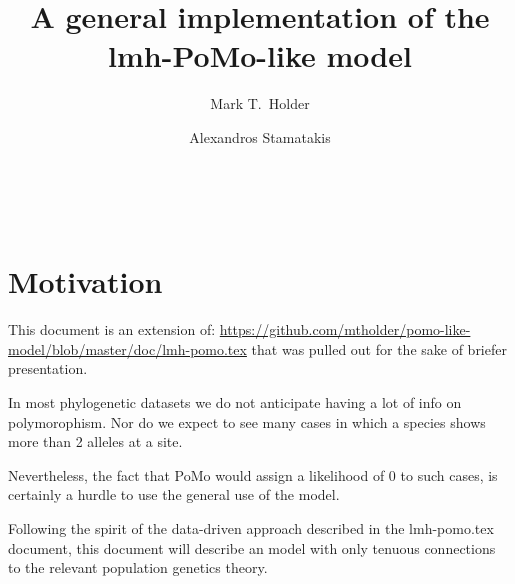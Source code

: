 \documentclass{llncs}
\begin{document}
\title{A general implementation of the lmh-PoMo-like model}
\author{Mark T.~Holder\and Alexandros Stamatakis}
\\
\newcommand\enum{\addtocounter{equation}{1}\tag{\theequation}}
\maketitle              %
\section {Motivation}
This document is an extension of:
 \url{https://github.com/mtholder/pomo-like-model/blob/master/doc/lmh-pomo.tex}
that was pulled out for the sake of briefer presentation.

In most phylogenetic datasets we do not anticipate having a lot of info
    on polymorophism.
Nor do we expect to see many cases in which a species shows more than 2 alleles
    at a site.

Nevertheless, the fact that PoMo would assign a likelihood of 0 to such cases, is
    certainly a hurdle to use the general use of the model.

Following the spirit of the data-driven approach described in the lmh-pomo.tex document,
    this document will describe an model with only tenuous connections to the relevant
    population genetics theory.
\end{document}
